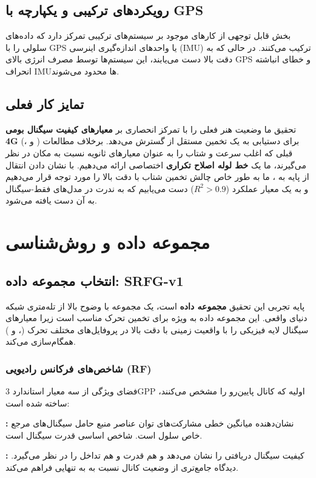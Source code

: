 \documentclass{CSICC}
\begin{document}
\subsection{رویکردهای ترکیبی و یکپارچه با GPS}
بخش قابل توجهی از کارهای موجود بر سیستم‌های ترکیبی تمرکز دارد که داده‌های سلولی را با GPS یا واحدهای اندازه‌گیری اینرسی (IMU) ترکیب می‌کنند. در حالی که به دقت بالا دست می‌یابند، این سیستم‌ها توسط مصرف انرژی بالای GPS و خطای انباشته انحراف IMUها محدود می‌شوند.
\subsection{تمایز کار فعلی}
تحقیق ما وضعیت هنر فعلی را با تمرکز انحصاری بر \textbf{معیارهای کیفیت سیگنال بومی 4G} (،  و ) برای دستیابی به یک تخمین مستقل از  گسترش می‌دهد. برخلاف مطالعات قبلی که اغلب سرعت و شتاب را به عنوان معیارهای ثانویه نسبت به مکان در نظر می‌گیرند، ما یک \textbf{خط لوله اصلاح تکراری} اختصاصی ارائه می‌دهیم. با نشان دادن انتقال از  پایه به ، ما به طور خاص چالش تخمین شتاب با دقت بالا را مورد توجه قرار می‌دهیم و به یک معیار عملکرد (\(R^{2}>0.9\)) دست می‌یابیم که به ندرت در مدل‌های فقط-سیگنال به آن دست یافته می‌شود.

\section{مجموعه داده و روش‌شناسی}
\subsection{انتخاب مجموعه داده: SRFG-v1}
پایه تجربی این تحقیق \textbf{مجموعه داده } است، یک مجموعه با وضوح بالا از تله‌متری شبکه  دنیای واقعی. این مجموعه داده به ویژه برای تخمین تحرک مناسب است زیرا معیارهای سیگنال لایه فیزیکی را با واقعیت زمینی  با دقت بالا در پروفایل‌های مختلف تحرک (،  و ) همگام‌سازی می‌کند.
\subsubsection{شاخص‌های فرکانس رادیویی (RF)}
فضای ویژگی از سه معیار استاندارد 3GPP اولیه که کانال پایین‌رو را مشخص می‌کنند، ساخته شده است:

\textbf{:} نشان‌دهنده میانگین خطی مشارکت‌های توان عناصر منبع حامل سیگنال‌های مرجع خاص سلول است. شاخص اساسی قدرت سیگنال است.

\textbf{:} کیفیت سیگنال دریافتی را نشان می‌دهد و هم قدرت و هم تداخل را در نظر می‌گیرد. دیدگاه جامع‌تری از وضعیت کانال نسبت به  به تنهایی فراهم می‌کند.
\end{document}
